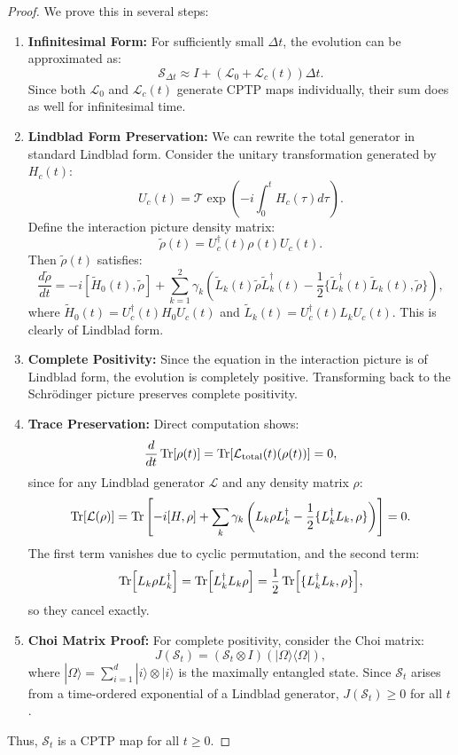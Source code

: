 \documentclass[11pt]{article}
\begin{document}
\begin{proof}
We prove this in several steps:

\begin{enumerate}
\item \textbf{Infinitesimal Form:} For sufficiently small $\Delta t$, the evolution can be approximated as:
\[
\mathcal{S}_{\Delta t} \approx I + (\mathcal{L}_0 + \mathcal{L}_c(t))\Delta t.
\]
Since both $\mathcal{L}_0$ and $\mathcal{L}_c(t)$ generate CPTP maps individually, their sum does as well for infinitesimal time.

\item \textbf{Lindblad Form Preservation:} We can rewrite the total generator in standard Lindblad form. Consider the unitary transformation generated by $H_c(t)$:
\[
U_c(t) = \mathcal{T} \exp\left( -i\int_0^t H_c(\tau) d\tau \right).
\]
Define the interaction picture density matrix:
\[
\tilde{\rho}(t) = U_c^\dagger(t) \rho(t) U_c(t).
\]
Then $\tilde{\rho}(t)$ satisfies:
\[
\frac{d\tilde{\rho}}{dt} = -i[\tilde{H}_0(t), \tilde{\rho}] + \sum_{k=1}^2 \gamma_k \left( \tilde{L}_k(t) \tilde{\rho} \tilde{L}_k^\dagger(t) - \frac{1}{2}\{\tilde{L}_k^\dagger(t)\tilde{L}_k(t), \tilde{\rho}\} \right),
\]
where $\tilde{H}_0(t) = U_c^\dagger(t) H_0 U_c(t)$ and $\tilde{L}_k(t) = U_c^\dagger(t) L_k U_c(t)$. This is clearly of Lindblad form.

\item \textbf{Complete Positivity:} Since the equation in the interaction picture is of Lindblad form, the evolution is completely positive. Transforming back to the Schrödinger picture preserves complete positivity.

\item \textbf{Trace Preservation:} Direct computation shows:
\[
\frac{d}{dt} \Tr[\rho(t)] = \Tr[\mathcal{L}_{\text{total}}(t)(\rho(t))] = 0,
\]
since for any Lindblad generator $\mathcal{L}$ and any density matrix $\rho$:
\[
\Tr[\mathcal{L}(\rho)] = \Tr\left[ -i[H, \rho] + \sum_k \gamma_k \left( L_k \rho L_k^\dagger - \frac{1}{2}\{L_k^\dagger L_k, \rho\} \right) \right] = 0.
\]
The first term vanishes due to cyclic permutation, and the second term:
\[
\Tr[L_k \rho L_k^\dagger] = \Tr[L_k^\dagger L_k \rho] = \frac{1}{2}\Tr[\{L_k^\dagger L_k, \rho\}],
\]
so they cancel exactly.

\item \textbf{Choi Matrix Proof:} For complete positivity, consider the Choi matrix:
\[
J(\mathcal{S}_t) = (\mathcal{S}_t \otimes I)(|\Omega\rangle\langle\Omega|),
\]
where $|\Omega\rangle = \sum_{i=1}^d |i\rangle \otimes |i\rangle$ is the maximally entangled state. Since $\mathcal{S}_t$ arises from a time-ordered exponential of a Lindblad generator, $J(\mathcal{S}_t) \geq 0$ for all $t$.
\end{enumerate}
Thus, $\mathcal{S}_t$ is a CPTP map for all $t \geq 0$.
\end{proof}
\end{document}
